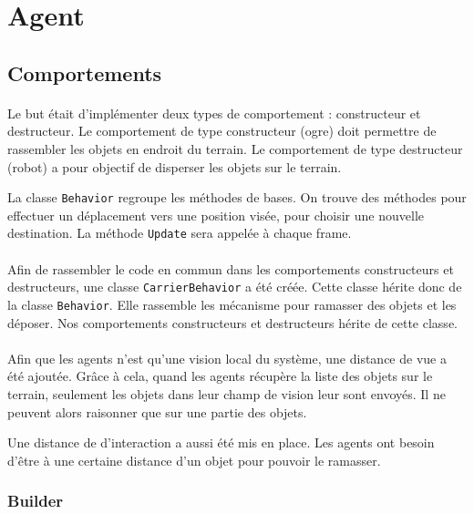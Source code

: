 \section{Agent}

\subsection{Comportements}
\paragraph{}Le but était d'implémenter deux types de comportement :
constructeur et destructeur. Le
comportement de type constructeur (ogre) doit permettre de rassembler les objets
en endroit du terrain. Le comportement de type destructeur (robot) a pour
objectif de disperser les objets sur le terrain.

La classe \texttt{Behavior} regroupe les méthodes de bases. On trouve des
méthodes pour effectuer un déplacement vers une position visée, pour choisir
une nouvelle destination. La méthode \texttt{Update} sera appelée à chaque frame.

\paragraph{}Afin de rassembler le code en commun dans les comportements constructeurs et
destructeurs, une classe \texttt{CarrierBehavior} a été créée. Cette classe
hérite donc de la classe \texttt{Behavior}.  Elle rassemble les mécanisme pour
ramasser des objets et les déposer. Nos comportements constructeurs et destructeurs
hérite de cette classe.

\paragraph{}Afin que les agents n'est qu'une vision local du système, une
distance de vue a été ajoutée. Grâce à cela, quand les agents récupère la
liste des objets sur le terrain, seulement les objets dans leur champ de
vision leur sont envoyés. Il ne peuvent alors raisonner que sur une partie des
objets.

Une distance de d'interaction a aussi été mis en place. Les agents ont besoin
d'être à une certaine distance d'un objet pour pouvoir le ramasser.

\subsubsection{Builder}
